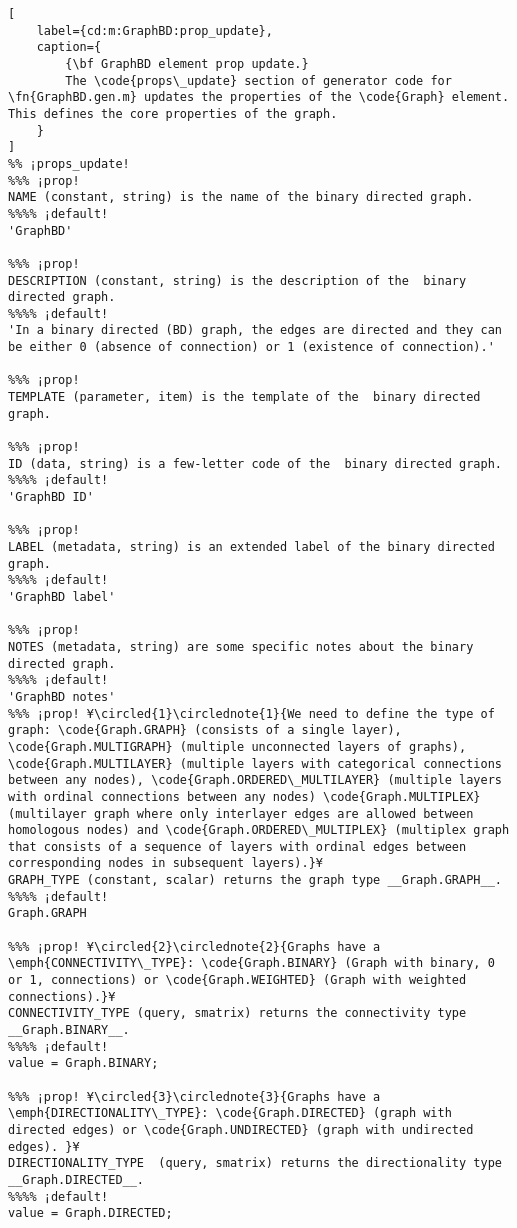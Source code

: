 \documentclass{tufte-handout}
\begin{document}
\begin{lstlisting}[
	label={cd:m:GraphBD:prop_update},
	caption={
		{\bf GraphBD element prop update.}
		The \code{props\_update} section of generator code for \fn{GraphBD.gen.m} updates the properties of the \code{Graph} element. This defines the core properties of the graph.
	}
]
%% ¡props_update!
%%% ¡prop!
NAME (constant, string) is the name of the binary directed graph.
%%%% ¡default!
'GraphBD'

%%% ¡prop!
DESCRIPTION (constant, string) is the description of the  binary directed graph.
%%%% ¡default!
'In a binary directed (BD) graph, the edges are directed and they can be either 0 (absence of connection) or 1 (existence of connection).'

%%% ¡prop!
TEMPLATE (parameter, item) is the template of the  binary directed graph.

%%% ¡prop!
ID (data, string) is a few-letter code of the  binary directed graph.
%%%% ¡default!
'GraphBD ID'

%%% ¡prop!
LABEL (metadata, string) is an extended label of the binary directed graph.
%%%% ¡default!
'GraphBD label'

%%% ¡prop!
NOTES (metadata, string) are some specific notes about the binary directed graph.
%%%% ¡default!
'GraphBD notes'
%%% ¡prop! ¥\circled{1}\circlednote{1}{We need to define the type of graph: \code{Graph.GRAPH} (consists of a single layer), \code{Graph.MULTIGRAPH} (multiple unconnected layers of graphs), \code{Graph.MULTILAYER} (multiple layers with categorical connections between any nodes), \code{Graph.ORDERED\_MULTILAYER} (multiple layers with ordinal connections between any nodes) \code{Graph.MULTIPLEX} (multilayer graph where only interlayer edges are allowed between homologous nodes) and \code{Graph.ORDERED\_MULTIPLEX} (multiplex graph that consists of a sequence of layers with ordinal edges between corresponding nodes in subsequent layers).}¥
GRAPH_TYPE (constant, scalar) returns the graph type __Graph.GRAPH__.
%%%% ¡default!
Graph.GRAPH

%%% ¡prop! ¥\circled{2}\circlednote{2}{Graphs have a \emph{CONNECTIVITY\_TYPE}: \code{Graph.BINARY} (Graph with binary, 0 or 1, connections) or \code{Graph.WEIGHTED} (Graph with weighted connections).}¥
CONNECTIVITY_TYPE (query, smatrix) returns the connectivity type __Graph.BINARY__.
%%%% ¡default!
value = Graph.BINARY;

%%% ¡prop! ¥\circled{3}\circlednote{3}{Graphs have a \emph{DIRECTIONALITY\_TYPE}: \code{Graph.DIRECTED} (graph with directed edges) or \code{Graph.UNDIRECTED} (graph with undirected edges). }¥
DIRECTIONALITY_TYPE  (query, smatrix) returns the directionality type __Graph.DIRECTED__.
%%%% ¡default!
value = Graph.DIRECTED;


\end{lstlisting}
\end{document}
